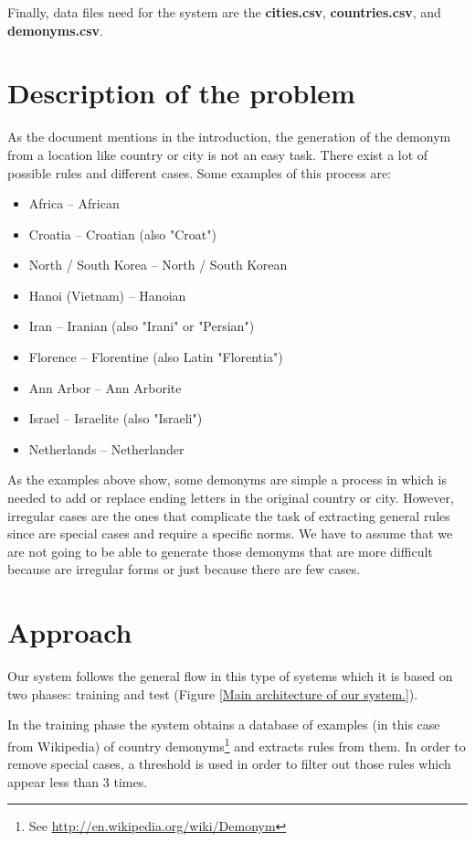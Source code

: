 \documentclass[]{report}
\begin{document}
Finally, data files need for the system are the \textbf{cities.csv}, \textbf{countries.csv}, and \textbf{demonyms.csv}.

\section{Description of the problem}

As the document mentions in the introduction, the generation of the demonym from a location like country or city is not an easy task. There exist a lot of possible rules and different cases. 
\vspace{0.5cm}
Some examples of this process are:
\begin{itemize}
\item Africa -- African
\item Croatia -- Croatian (also "Croat")
\item North / South Korea -- North / South Korean
\item Hanoi (Vietnam) -- Hanoian
\item Iran -- Iranian (also "Irani" or "Persian")
\item Florence -- Florentine (also Latin "Florentia")
\item Ann Arbor -- Ann Arborite
\item Israel -- Israelite (also "Israeli")
\item Netherlands -- Netherlander
\end{itemize}

As the examples above show, some demonyms are simple a process in which is needed to add or replace ending letters in the original country or city. However, irregular cases are the ones that complicate the task of extracting general rules since are special cases and require a specific norms. We have to assume that we are not going to be able to generate those demonyms that are more difficult because are irregular forms or just because there are few cases.


\newpage
\section{Approach}


Our system follows the general flow in this type of systems which it is based on two phases: training and test (Figure \ref{Main architecture of our system.}). 

In the training phase the system obtains a database of examples (in this case from Wikipedia) of country demonyms\footnote{See \href{Wikipedia Demonym page}{http://en.wikipedia.org/wiki/Demonym}} and extracts rules from them.
In order to remove special cases, a threshold is used in order to filter out those rules which appear less than 3 times.
\end{document}
